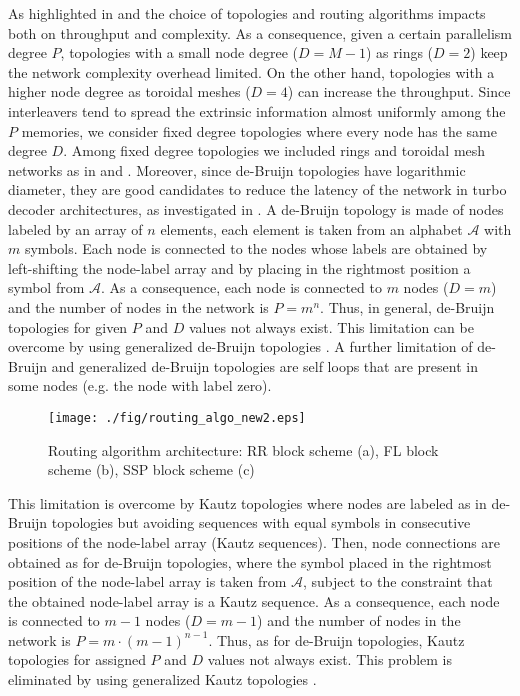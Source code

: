 \documentclass[10pt,twocolumn,journal]{IEEEtran}
\begin{document}
As highlighted in \cite{wehn_iscas05} and \cite{moussa_iscas08} the choice of topologies and routing algorithms 
impacts both on throughput and complexity. As a consequence, given a certain parallelism degree $P$, topologies 
with a small node degree ($D=M-1$) as rings ($D=2$) keep the network complexity overhead limited. 
On the other hand, topologies with a higher node degree 
as toroidal meshes ($D=4$) can increase the throughput. Since interleavers tend to spread the extrinsic information 
almost uniformly among the $P$ memories, we consider fixed degree topologies where every node has the same degree $D$. 
Among fixed degree topologies we included rings and toroidal mesh networks as in \cite{wehn_icecs02} and 
\cite{wehn_iscas05}. 
Moreover, since de-Bruijn topologies have logarithmic diameter, they are good candidates to 
reduce the latency of the network in turbo decoder architectures, as investigated in \cite{moussa_iscas08}.
A de-Bruijn topology is made of nodes labeled by an array of $n$ elements, each element is taken from an 
alphabet $\mathcal{A}$ with $m$ symbols. 
Each node is connected to the nodes whose labels are obtained by left-shifting the 
node-label array and by placing in the rightmost position a symbol from $\mathcal{A}$. As a consequence, each node 
is connected to $m$ nodes ($D=m$) and the number of nodes in the network is $P=m^n$. Thus, in general, de-Bruijn 
topologies for given $P$ and $D$ values not always exist. This limitation can be overcome by using generalized 
de-Bruijn topologies \cite{imase_TC81}. 
A further limitation of de-Bruijn and generalized de-Bruijn topologies are 
self loops that are present in some nodes (e.g. the node with label zero). 
\begin{figure*}[t!]
  \centering
  \texttt{[image: ./fig/routing\_algo\_new2.eps]}
\caption{Routing algorithm architecture: RR block scheme (a), FL block scheme (b), SSP block scheme (c)}
\label{fig:routing_algo}
\end{figure*}

This limitation is overcome by Kautz topologies where nodes are labeled as in de-Bruijn topologies but avoiding 
sequences with equal symbols in consecutive positions of the node-label array 
(Kautz sequences). 
Then, node connections are obtained as for de-Bruijn topologies, where the symbol placed in the rightmost position of 
the node-label array is taken from $\mathcal{A}$, subject to the constraint that the obtained node-label array 
is a Kautz sequence. As a consequence, each node is connected to $m-1$ nodes ($D=m-1$) and the number of
nodes in the network is $P=m\cdot(m-1)^{n-1}$. Thus, as for de-Bruijn topologies, Kautz topologies for assigned 
$P$ and $D$ values not always exist. This problem is eliminated by using generalized Kautz topologies 
\cite{imase_TC83}.
\end{document}
